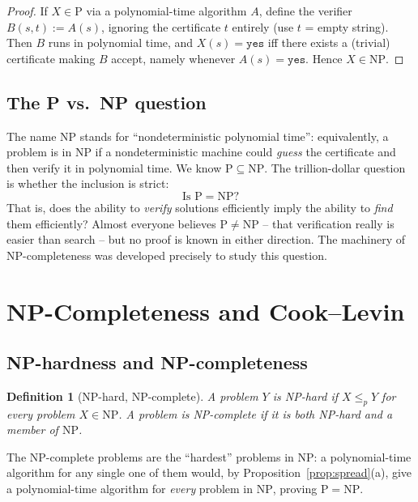 \documentclass[11pt]{article}
\newtheorem{definition}[theorem]{Definition}
\begin{document}
\begin{proof}
If $X \in \mathrm{P}$ via a polynomial-time algorithm $A$, define the verifier
$B(s, t) := A(s)$, ignoring the certificate $t$ entirely (use $t$ = empty string). Then $B$
runs in polynomial time, and $X(s) = \mathtt{yes}$ iff there exists a (trivial) certificate
making $B$ accept, namely whenever $A(s) = \mathtt{yes}$. Hence $X \in \mathrm{NP}$.
\end{proof}

\subsection{The P vs.\ NP question}

The name $\mathrm{NP}$ stands for ``nondeterministic polynomial time'': equivalently, a
problem is in $\mathrm{NP}$ if a nondeterministic machine could \emph{guess} the
certificate and then verify it in polynomial time. We know $\mathrm{P} \subseteq
\mathrm{NP}$. The trillion-dollar question is whether the inclusion is strict:
\[
\text{Is } \mathrm{P} = \mathrm{NP}?
\]
That is, does the ability to \emph{verify} solutions efficiently imply the ability to
\emph{find} them efficiently? Almost everyone believes $\mathrm{P} \ne \mathrm{NP}$ -- that
verification really is easier than search -- but no proof is known in either direction. The
machinery of NP-completeness was developed precisely to study this question.

\section{NP-Completeness and Cook--Levin}

\subsection{NP-hardness and NP-completeness}

\begin{definition}[NP-hard, NP-complete]
A problem $Y$ is \emph{NP-hard} if $X \le_p Y$ for \emph{every} problem $X \in \mathrm{NP}$.
A problem is \emph{NP-complete} if it is both NP-hard and a member of $\mathrm{NP}$.
\end{definition}

The NP-complete problems are the ``hardest'' problems in $\mathrm{NP}$: a polynomial-time
algorithm for any single one of them would, by Proposition~\ref{prop:spread}(a), give a
polynomial-time algorithm for \emph{every} problem in $\mathrm{NP}$, proving $\mathrm{P} =
\mathrm{NP}$.
\end{document}
